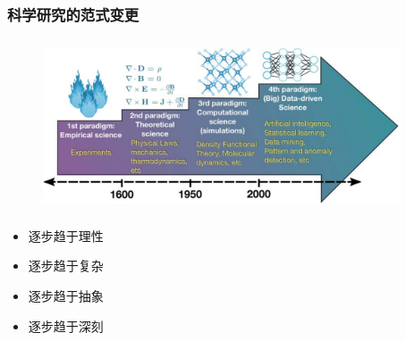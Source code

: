 \small
\frame
{
	\frametitle{科学研究的范式变更}
\begin{figure}[h!]
\vspace*{-0.28in}
\centering
\includegraphics[height=2.00in,width=4.15in]{Figures/Four_Model_3.png}
\label{Four_Model}
\end{figure}
\begin{minipage}[b]{0.48\textwidth}
 {\fontsize{9.5pt}{6.0pt}\selectfont\begin{itemize}%
	 \setlength{\itemsep}{6pt}
 \item 逐步趋于理性
 \item 逐步趋于复杂
 \end{itemize}}
\end{minipage}
\hfill
\begin{minipage}[b]{0.48\textwidth}
 {\fontsize{9.5pt}{6.0pt}\selectfont\begin{itemize}%
	 \setlength{\itemsep}{6pt}
 \item 逐步趋于抽象
 \item 逐步趋于深刻
 \end{itemize}}
\end{minipage}
}

